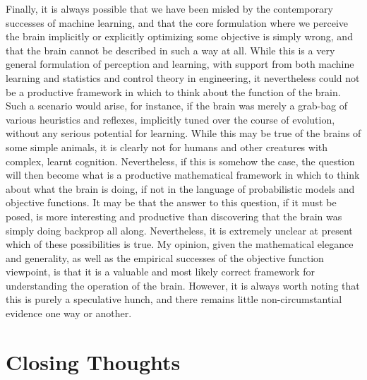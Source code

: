 Finally, it is always possible that we have been misled by the contemporary successes of machine learning, and that the core formulation where we perceive the brain implicitly or explicitly optimizing some objective is simply wrong, and that the brain cannot be described in such a way at all. While this is a very general formulation of perception and learning, with support from both machine learning and statistics and control theory in engineering, it nevertheless could not be a productive framework in which to think about the function of the brain. Such a scenario would arise, for instance, if the brain was merely a grab-bag of various heuristics and reflexes, implicitly tuned over the course of evolution, without any serious potential for learning. While this may be true of the brains of some simple animals, it is clearly not for humans and other creatures with complex, learnt cognition. Nevertheless, if this is somehow the case, the question will then become what is a productive mathematical framework in which to think about what the brain is doing, if not in the language of probabilistic models and objective functions. It may be that the answer to this question, if it must be posed, is more interesting and productive than discovering that the brain was simply doing backprop all along. Nevertheless, it is extremely unclear at present which of these possibilities is true. My opinion, given the mathematical elegance and generality, as well as the empirical successes of the objective function viewpoint, is that it is a valuable and most likely correct framework for understanding the operation of the brain. However, it is always worth noting that this is purely a speculative hunch, and there remains little non-circumstantial evidence one way or another.

\section{Closing Thoughts}

